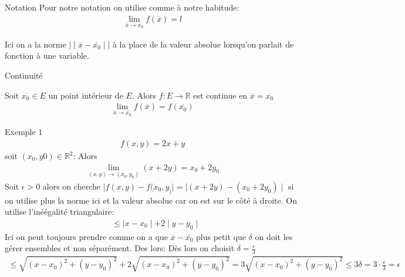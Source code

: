  \begin{parag}{Notation}
     Pour notre notation on utilise comme à notre habitude:
     \begin{align*}
         \lim_{ \overline{x} \to \overline{x_0}}f( \overline{x}) = l
     \end{align*}
     \begin{framedremark}
         Ici on a la norme $  \mid \mid \overline{x} - \overline{x_0} \mid \mid$ à la place de la valeur absolue lorsqu'on parlait de fonction à une variable. 
     \end{framedremark}
     
 \end{parag}
 \begin{parag}{Continuité}
 
 
 \begin{definition}
     Soit $ \overline{x_0} \in E$ un point intérieur de $E$. Alors $f: E \to \mathbb{R}$ est continue en $ \overline{x} = \overline{x_0}$ 
     \begin{align*}
     \lim_{ \overline{x} \to \overline{x_0}} f( \overline{x}) = f( \overline{x_0})
     \end{align*}
     
 \end{definition}
 

 \begin{subparag}{Exemple 1}
     \begin{align*}
         f(x, y) = 2x + y
     \end{align*}
     soit $(x_0, y0) \in \mathbb{R}^2$: Alors 
     \begin{align*}
         \lim_{(x, y) \to (x_0, y_0)} (x + 2y) = x_0 + 2y_0
     \end{align*}
     Soit $ \epsilon > 0$ alors on cherche $ \mid f(x, y) - f(x_0, y_) \mid = \mid  (x + 2y) - (x_0 + 2y_0) \mid$ si on utilise plus la norme ici et la valeur absolue car on est sur le côté à droite. On utilise l'inéégalité triangulaire:
     \begin{align*}
        &\leq \mid x - x_0 \mid + 2 \mid y - y_0 \mid
     \end{align*}
     Ici on peut toujours prendre comme on a que $ \overline{x} - \overline{x_0}$ plus petit que $ \delta$ on doit les gérer ensembles et non séparément. Des lors:
     Dès lors on choisit $ \delta = \frac{ \epsilon}{3}$
        \begin{align*}
        \leq \sqrt{ (x-x_0)^2 + (y-y_0)^2} + 2\sqrt{(x-x_0)^2 + (y-y_0)^2} = 3\sqrt{(x -x_0)^2 + (y-y_0)^2} \leq 3 \delta = 3 \cdot \frac{ \epsilon}{3} = \epsilon
           \end{align*}


\end{subparag}
\end{parag}

